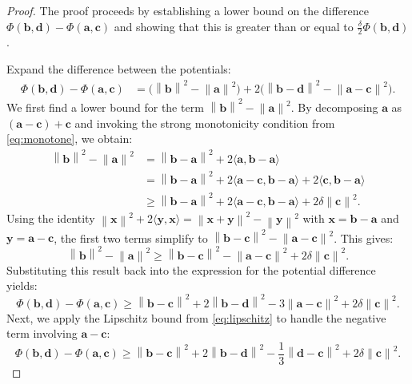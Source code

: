 \documentclass[letterpaper,11pt]{article}
\newcommand{\norm}[1]{\left\| #1 \right\|}
\newcommand{\vect}[1]{\mathbf{#1}}
\begin{document}
\begin{proof}
The proof proceeds by establishing a lower bound on the difference $\Phi(\vect{b}, \vect{d}) - \Phi(\vect{a}, \vect{c})$ and showing that this is greater than or equal to $\frac{\delta}{2}\Phi(\vect{b}, \vect{d})$.

Expand the difference between the potentials:
\begin{align*}
\Phi(\vect{b}, \vect{d}) - \Phi(\vect{a}, \vect{c}) &= \bigl(\norm{\vect{b}}^{2}-\norm{\vect{a}}^{2}\bigr) + 2\bigl(\norm{\vect{b}-\vect{d}}^{2}-\norm{\vect{a}-\vect{c}}^{2}\bigr).
\end{align*}
We first find a lower bound for the term $\norm{\vect{b}}^{2}-\norm{\vect{a}}^{2}$. By decomposing $\vect{a}$ as $(\vect{a}-\vect{c})+\vect{c}$ and invoking the strong monotonicity condition from \cref{eq:monotone}, we obtain:
\begin{align*}
\norm{\vect{b}}^{2}-\norm{\vect{a}}^{2} &= \norm{\vect{b}-\vect{a}}^{2}+2\langle \vect{a}, \vect{b}-\vect{a}\rangle \\
&= \norm{\vect{b}-\vect{a}}^{2}+2\langle \vect{a}-\vect{c}, \vect{b}-\vect{a}\rangle + 2\langle \vect{c}, \vect{b}-\vect{a}\rangle \\
&\ge \norm{\vect{b}-\vect{a}}^{2}+2\langle \vect{a}-\vect{c}, \vect{b}-\vect{a}\rangle + 2\delta \norm{\vect{c}}^{2}.
\end{align*}
Using the identity $\norm{\vect{x}}^2 + 2\langle \vect{y}, \vect{x} \rangle = \norm{\vect{x}+\vect{y}}^2 - \norm{\vect{y}}^2$ with $\vect{x} = \vect{b}-\vect{a}$ and $\vect{y} = \vect{a}-\vect{c}$, the first two terms simplify to $\norm{\vect{b}-\vect{c}}^{2}-\norm{\vect{a}-\vect{c}}^{2}$. This gives:
\[
\norm{\vect{b}}^{2}-\norm{\vect{a}}^{2} \ge \norm{\vect{b}-\vect{c}}^{2}-\norm{\vect{a}-\vect{c}}^{2}+2\delta \norm{\vect{c}}^{2}.
\]
Substituting this result back into the expression for the potential difference yields:
\begin{equation}\label{eq:gf-first}
\Phi(\vect{b}, \vect{d}) - \Phi(\vect{a}, \vect{c}) \ge \norm{\vect{b}-\vect{c}}^{2} + 2\norm{\vect{b}-\vect{d}}^{2} - 3\norm{\vect{a}-\vect{c}}^{2} + 2\delta \norm{\vect{c}}^{2}.
\end{equation}
Next, we apply the Lipschitz bound from \cref{eq:lipschitz} to handle the negative term involving $\vect{a}-\vect{c}$:
\begin{equation}\label{eq:gf-second}
\Phi(\vect{b}, \vect{d}) - \Phi(\vect{a}, \vect{c}) \ge \norm{\vect{b}-\vect{c}}^{2} + 2\norm{\vect{b}-\vect{d}}^{2} - \frac{1}{3}\norm{\vect{d}-\vect{c}}^{2} + 2\delta \norm{\vect{c}}^{2}.
\end{equation}


\end{proof}
\end{document}
